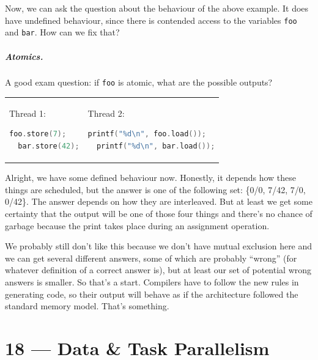 \documentclass[a4paper]{report}
\begin{document}
Now, we can ask the question about the behaviour of the above example.
It does have undefined behaviour, since there is contended access to
the variables {\tt foo} and {\tt bar}. How can we fix that?

\paragraph{Atomics.}
A good exam question: if {\tt foo} is atomic, what are the possible outputs? 
    
    \begin{tabular}{ll}
      \begin{minipage}{.25\textwidth}
        Thread 1:
        \begin{lstlisting}[language=C]
  foo.store(7);
  bar.store(42);
        \end{lstlisting}
      \end{minipage} &
      \begin{minipage}{.45\textwidth}
        Thread 2:
        \begin{lstlisting}[language=C]
  printf("%d\n", foo.load());
  printf("%d\n", bar.load());
        \end{lstlisting}
      \end{minipage}
    \end{tabular}

Alright, we have some defined behaviour now.  Honestly, it depends how these things are scheduled, but the answer is one of the following set: \{0/0, 7/42, 7/0,  0/42\}. The answer depends on how they are interleaved. But at least we get some certainty that the output will be one of those four things and there's no chance of garbage because the print takes place during an assignment operation. 

We probably still don't like this because we don't have mutual exclusion here and we can get several different answers, some of which are probably ``wrong'' (for whatever definition of a correct answer is), but at least our set of potential wrong answers is smaller. So that's a start. Compilers have to follow the new rules in generating code, so their output will behave as if the architecture followed the standard memory model. That's something. 










\chapter*{18 --- Data \& Task Parallelism}
\end{document}

